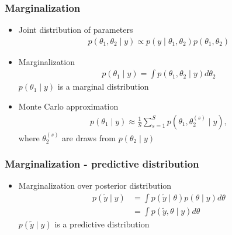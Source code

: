 \documentclass[10pt,handout]{beamer}
\begin{document}
\begin{frame}

\frametitle{Marginalization}

  \begin{itemize}
  \item Joint distribution of parameters
    \begin{align*}
      p(\theta_1,\theta_2 \mid y) \propto p(y \mid \theta_1,\theta_2)p(\theta_1,\theta_2)
    \end{align*}
  \item Marginalization
      \begin{align*}
        p(\theta_1 \mid y) = \int p(\theta_1,\theta_2 \mid y) d\theta_2
      \end{align*}
      $p(\theta_1 \mid y)$ is a marginal distribution
       \vspace{0.5\baselineskip}
    \item<2-> Monte Carlo approximation
          \begin{align*}
      p(\theta_1 \mid y) \approx  \frac{1}{S}\sum_{s=1}^{S} p(\theta_1,\theta_2^{(s)}\mid y),
    \end{align*}
    where $\theta_2^{(s)}$ are draws from $p(\theta_2 \mid y)$
  \end{itemize}

\end{frame}

\begin{frame}

\frametitle{Marginalization - predictive distribution}

  \begin{itemize}
  \item Marginalization over posterior distribution
      \begin{align*}
        p(\tilde{y} \mid y) & = \int p(\tilde{y} \mid \theta)p(\theta \mid y) d\theta\\
         & = \int p(\tilde{y}, \theta \mid y) d\theta
      \end{align*}
      $p(\tilde{y} \mid y)$ is a predictive distribution
  \end{itemize}

\end{frame}
\end{document}
